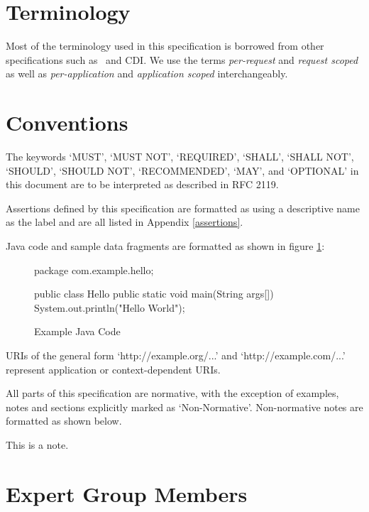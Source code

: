 \section{Terminology}
\label{terminology}

Most of the terminology used in this specification is borrowed from other specifications 
such as \jaxrs\ and CDI. We use the terms {\em per-request} and {\em request scoped} as
well as {\em per-application} and {\em application scoped} interchangeably.

\section{Conventions}

The keywords `MUST', `MUST NOT', `REQUIRED', `SHALL', `SHALL NOT', `SHOULD', `SHOULD NOT', 
`RECOMMENDED', `MAY', and `OPTIONAL' in this document are to be interpreted as described in 
RFC 2119\cite{rfc2119}. 

Assertions defined by this specification are formatted as {\textbf{\rrrb}} 
using a descriptive name as the label and are all listed in Appendix \ref{assertions}.

Java code and sample data fragments are formatted as shown in figure \ref{ex1}:

\begin{figure}[hbtp]
\caption{Example Java Code}
\label{ex1}
\begin{listing}{1}
package com.example.hello;

public class Hello {
    public static void main(String args[]) {
        System.out.println("Hello World");
    }
}\end{listing}
\end{figure}

URIs of the general form `http://example.org/...' and `http://example.com/...' represent application 
or context-dependent URIs.

All parts of this specification are normative, with the exception of examples, notes and sections
explicitly marked as `Non-Normative'. Non-normative notes are formatted as shown below.

\begin{nnnote*}
This is a note.
\end{nnnote*}

\section{Expert Group Members} 
\label{expert_group}

